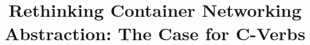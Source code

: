 \documentclass{cls/sig-alternate-10pt}
\begin{document}
\title{Rethinking Container Networking Abstraction: The Case for C-Verbs}

\date{}


\maketitle
\thispagestyle{empty}









%
%
\end{document}
